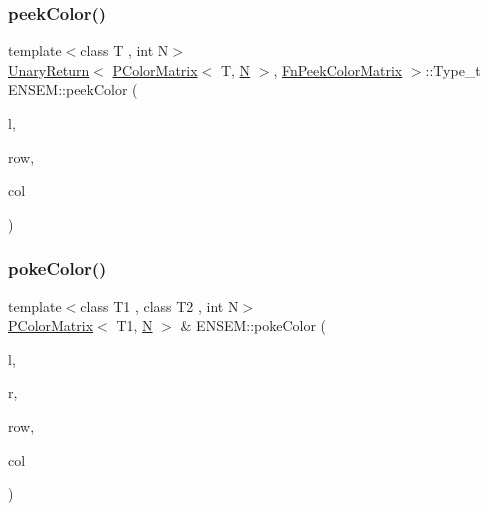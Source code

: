 \subsubsection{\texorpdfstring{peekColor()}{peekColor()}}
{\footnotesize\ttfamily template$<$class T , int N$>$ \\
\mbox{\hyperlink{structENSEM_1_1UnaryReturn}{Unary\+Return}}$<$ \mbox{\hyperlink{classENSEM_1_1PColorMatrix}{P\+Color\+Matrix}}$<$ T, \mbox{\hyperlink{adat__devel_2lib_2hadron_2operator__name__util_8cc_a7722c8ecbb62d99aee7ce68b1752f337}{N}} $>$, \mbox{\hyperlink{structENSEM_1_1FnPeekColorMatrix}{Fn\+Peek\+Color\+Matrix}} $>$\+::Type\+\_\+t E\+N\+S\+E\+M\+::peek\+Color (\begin{DoxyParamCaption}\item[{const \mbox{\hyperlink{classENSEM_1_1PColorMatrix}{P\+Color\+Matrix}}$<$ T, \mbox{\hyperlink{adat__devel_2lib_2hadron_2operator__name__util_8cc_a7722c8ecbb62d99aee7ce68b1752f337}{N}} $>$ \&}]{l,  }\item[{int}]{row,  }\item[{int}]{col }\end{DoxyParamCaption})\hspace{0.3cm}{\ttfamily [inline]}}

\mbox{\label{group__primcolormatrix_ga83e068e757a42e9866992b38a003d7f9}} 
\subsubsection{\texorpdfstring{pokeColor()}{pokeColor()}}
{\footnotesize\ttfamily template$<$class T1 , class T2 , int N$>$ \\
\mbox{\hyperlink{classENSEM_1_1PColorMatrix}{P\+Color\+Matrix}}$<$ T1, \mbox{\hyperlink{adat__devel_2lib_2hadron_2operator__name__util_8cc_a7722c8ecbb62d99aee7ce68b1752f337}{N}} $>$ \& E\+N\+S\+E\+M\+::poke\+Color (\begin{DoxyParamCaption}\item[{\mbox{\hyperlink{classENSEM_1_1PColorMatrix}{P\+Color\+Matrix}}$<$ T1, \mbox{\hyperlink{adat__devel_2lib_2hadron_2operator__name__util_8cc_a7722c8ecbb62d99aee7ce68b1752f337}{N}} $>$ \&}]{l,  }\item[{const \mbox{\hyperlink{classENSEM_1_1PScalar}{P\+Scalar}}$<$ T2 $>$ \&}]{r,  }\item[{int}]{row,  }\item[{int}]{col }\end{DoxyParamCaption})\hspace{0.3cm}{\ttfamily [inline]}}




